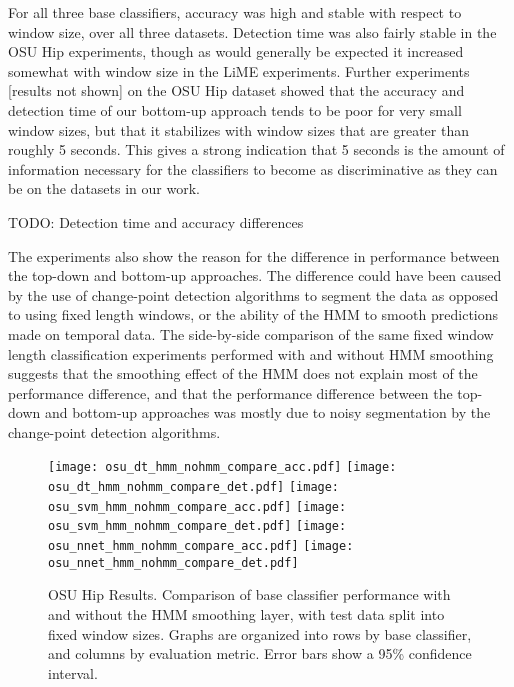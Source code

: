 For all three base classifiers, accuracy was high and
stable with respect to window size, over all three datasets. Detection
time was also fairly stable in the OSU Hip experiments, though as would
generally be expected it increased somewhat with window size in the LiME
experiments. Further experiments [results not shown] on the
OSU Hip dataset showed that the accuracy and detection time of our bottom-up approach 
tends to be poor for very small window sizes, but that it stabilizes with window sizes
that are greater than roughly 5 seconds. This gives a strong indication that
5 seconds is the amount of information necessary for the classifiers to become as
discriminative as they can be on the datasets in our work.

TODO: Detection time and accuracy differences

The experiments also show the reason for the difference in
performance between the top-down and bottom-up approaches. 
The difference could have been caused by the
use of change-point detection algorithms to segment the data as opposed to using
fixed length windows, or the ability of the HMM
to smooth predictions made on temporal data. The side-by-side comparison of the
same fixed window length classification experiments performed with and without HMM smoothing
suggests that the smoothing effect of the HMM
does not explain most of the performance difference, and that the performance difference between the top-down
and bottom-up approaches was mostly due to noisy segmentation by the change-point
detection algorithms.

 
\begin{figure}[H]
 \centering
 \texttt{[image: osu\_dt\_hmm\_nohmm\_compare\_acc.pdf]} \hspace{1em}\vspace{1em}
 \texttt{[image: osu\_dt\_hmm\_nohmm\_compare\_det.pdf]} 
 \texttt{[image: osu\_svm\_hmm\_nohmm\_compare\_acc.pdf]} \hspace{1em}\vspace{1em}
 \texttt{[image: osu\_svm\_hmm\_nohmm\_compare\_det.pdf]}
 \texttt{[image: osu\_nnet\_hmm\_nohmm\_compare\_acc.pdf]} \hspace{1em}
 \texttt{[image: osu\_nnet\_hmm\_nohmm\_compare\_det.pdf]}
 \caption{OSU Hip Results. Comparison of base classifier performance with and without the HMM
  smoothing layer, with test data split into fixed window sizes. Graphs are organized into rows by base
  classifier, and columns by evaluation metric. Error bars show a 95\% confidence interval.}
 \label{fig:osu_hmm}
\end{figure}

